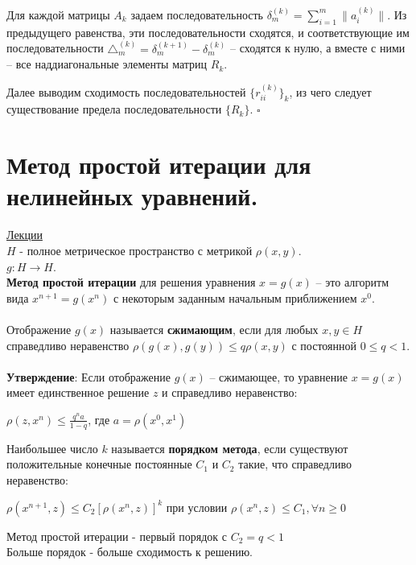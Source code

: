 \documentclass[specialist, subf, href, colorlinks=true, 12pt, times, mtpro, final]{disser}
\theoremstyle{definition}
\begin{document}
{Для каждой матрицы $A_k$ задаем последовательность $\delta^{(k)}_m = \sum\limits^m_{i=1} \|a^{(k)}_i\|$. Из предыдущего равенства, эти последовательности сходятся, и соответствующие им последовательности $\triangle^{(k)}_m = \delta^{(k+1)}_m - \delta^{(k)}_m$ \--- сходятся к нулю, а вместе с ними \--- все наддиагональные элементы матриц $R_k$.

Далее выводим сходимость последовательностей $\{r^{(k)}_{ii}\}_k$, из чего следует существование предела последовательности $\{R_k\}$. $\square$



\section {Метод простой итерации для нелинейных уравнений.}
    \hyperlink {lects.82}{Лекции}\\
    
$H$  - полное метрическое пространство с метрикой $\rho(x,y)$.\\
$g:H \rightarrow H$.\\

\textbf{Метод простой итерации} для решения уравнения $x = g(x)$ \--- это алгоритм вида $x^{n+1} = g(x^n)$ с некоторым заданным начальным приближением $x^0$.\\
\\
Отображение $g(x)$ называется \textbf{сжимающим}, если для любых $x, y \in H$ справедливо неравенство $\rho(g(x), g(y)) \leq q\rho(x,y)$ с постоянной $0 \leq q < 1$.\\
\\
\textbf{Утверждение}: Если отображение $g(x)$ \--- сжимающее, то уравнение $x=g(x)$  имеет единственное решение $z$ и справедливо неравенство:
\begin{center}
$\rho (z, x^n) \leq \frac{q^na}{1-q}$, где $a = \rho (x^0, x^1)$
\end{center}

Наибольшее число $k$ называется \textbf{порядком метода}, если существуют положительные конечные постоянные $C_1$ и $C_2$ такие, что справедливо неравенство:
\begin{center}
$\rho(x^{n+1}, z) \leq C_2 [\rho(x^n,z)]^k$ 
при условии
 $ \rho (x^n,z) \leq C_1, \forall n \geq 0$
\end{center}

Метод простой итерации - первый порядок с $C_2 = q < 1$\\

Больше порядок - больше сходимость к решению.
    

}
\end{document}
